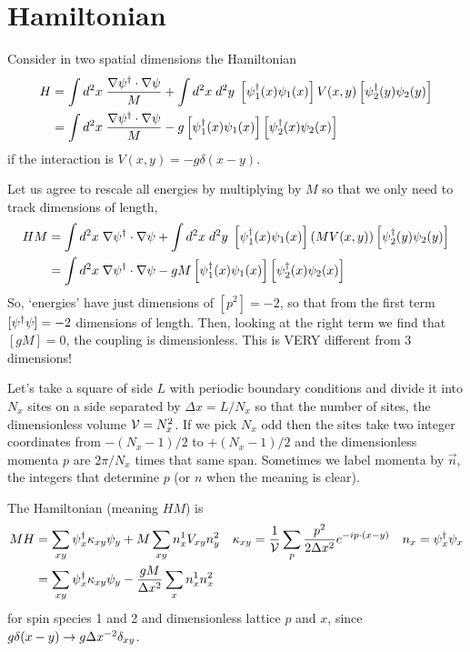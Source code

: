 \section{Hamiltonian}\label{sec:hamiltonian}

Consider in two spatial dimensions the Hamiltonian
\begin{align}
	H
	&= \int d^2x\; \frac{\nabla \psi{}^{\dagger} \cdot \nabla \psi}{M} + \int d^2x\; d^2y\; \left[\psi{}^{\dagger}_1(x) \psi_1(x)\right] V(x,y) \left[\psi{}^{\dagger}_2(y) \psi_2(y)\right]
	\\
	&= \int d^2x\; \frac{\nabla \psi{}^{\dagger} \cdot \nabla \psi}{M} - g \left[\psi{}^{\dagger}_1(x) \psi_1(x)\right] \left[\psi{}^{\dagger}_2(x) \psi_2(x)\right]
\end{align}
if the interaction is $V(x,y) = -g \delta(x-y)$.

Let us agree to rescale all energies by multiplying by $M$ so that we only need to track dimensions of length,
\begin{align}
	HM
	&= \int d^2x\; \nabla \psi{}^{\dagger} \cdot \nabla \psi + \int d^2x\; d^2y\; \left[\psi{}^{\dagger}_1(x) \psi_1(x)\right] (MV(x,y)) \left[\psi{}^{\dagger}_2(y) \psi_2(y)\right]
	\\
	&= \int d^2x\; \nabla \psi{}^{\dagger} \cdot \nabla \psi - gM \left[\psi{}^{\dagger}_1(x) \psi_1(x)\right] \left[\psi{}^{\dagger}_2(x) \psi_2(x)\right]
\end{align}
So, `energies' have just dimensions of $[p^2] = -2$, so that from the first term $[\psi{}^{\dagger}\psi] = -2$ dimensions of length.
Then, looking at the right term we find that $[gM] = 0$, the coupling is dimensionless.
This is VERY different from 3 dimensions!

Let's take a square of side $L$ with periodic boundary conditions and divide it into $N_x$ sites on a side separated by $\Delta x = L/N_x$ so that the number of sites, the dimensionless volume $\mathcal{V}=N_x^2$.
If we pick $N_x$ odd then the sites take two integer coordinates from $-(N_x-1)/2$ to $+(N_x-1)/2$ and the dimensionless momenta $p$ are $2\pi / N_x$ times that same span.
Sometimes we label momenta by $\vec{n}$, the integers that determine $p$ (or $n$ when the meaning is clear).

The Hamiltonian (meaning $HM$) is
\begin{align}
	MH &= \sum_{xy} \psi{}^{\dagger}_x \kappa_{xy} \psi_y + M \sum_{xy} n^1_x V_{xy} n^2_y
	&
    \kappa_{xy} &= \frac{1}{\mathcal{V}} \sum_{p} \frac{p^2}{2\Delta x^2} e^{-i p \cdot (x-y)}
	&
	n_x &= \psi{}^{\dagger}_x \psi_x
	\\
	&= \sum_{xy} \psi{}^{\dagger}_x \kappa_{xy} \psi_y - \frac{gM}{\Delta x^2} \sum_{x} n^1_x n^2_x
\end{align}
for spin species 1 and 2 and dimensionless lattice $p$ and $x$, since $g\delta(x-y) \rightarrow g \Delta x^{-2} \delta_{xy}$.

